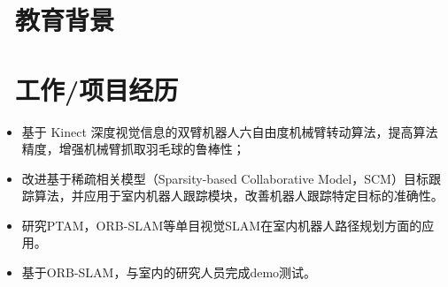 \documentclass{resume}
\begin{document}


\section{\faGraduationCap\  教育背景}

\section{\faUsers\ 工作/项目经历}


\begin{itemize}
  \item 基于 Kinect 深度视觉信息的双臂机器人六自由度机械臂转动算法，提高算法精度，增强机械臂抓取羽毛球的鲁棒性；
  \item 改进基于稀疏相关模型（Sparsity-based Collaborative Model，SCM）目标跟踪算法，并应用于室内机器人跟踪模块，改善机器人跟踪特定目标的准确性。
  \item 研究PTAM，ORB-SLAM等单目视觉SLAM在室内机器人路径规划方面的应用。
  \item 基于ORB-SLAM，与室内的研究人员完成demo测试。
\end{itemize}
\end{document}
